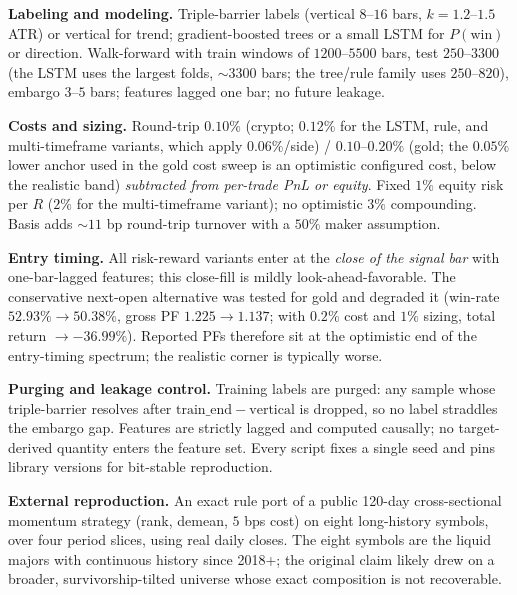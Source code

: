 \documentclass[sigconf,anonymous]{acmart}
\begin{document}
\textbf{Labeling and modeling.} Triple-barrier labels (vertical $8$–$16$ bars, $k{=}1.2$–$1.5$ ATR) or vertical for trend; gradient-boosted trees or a small LSTM for $P(\text{win})$ or direction. Walk-forward with train windows of $1200$–$5500$ bars, test $250$–$3300$ (the LSTM uses the largest folds, $\sim3300$ bars; the tree/rule family uses $250$–$820$), embargo $3$–$5$ bars; features lagged one bar; no future leakage.

\textbf{Costs and sizing.} Round-trip $0.10\%$ (crypto; $0.12\%$ for the LSTM, rule, and multi-timeframe variants, which apply $0.06\%$/side) / $0.10$–$0.20\%$ (gold; the $0.05\%$ lower anchor used in the gold cost sweep is an optimistic configured cost, below the realistic band) \emph{subtracted from per-trade PnL or equity}. Fixed $1\%$ equity risk per $R$ ($2\%$ for the multi-timeframe variant); no optimistic $3\%$ compounding. Basis adds ${\sim}11$ bp round-trip turnover with a $50\%$ maker assumption.

\textbf{Entry timing.} All risk-reward variants enter at the \emph{close of the signal bar} with one-bar-lagged features; this close-fill is mildly look-ahead-favorable. The conservative next-open alternative was tested for gold and degraded it (win-rate $52.93\%{\to}50.38\%$, gross PF $1.225{\to}1.137$; with $0.2\%$ cost and $1\%$ sizing, total return ${\to}-36.99\%$). Reported PFs therefore sit at the optimistic end of the entry-timing spectrum; the realistic corner is typically worse.

\textbf{Purging and leakage control.} Training labels are purged: any sample whose triple-barrier resolves after $\mathrm{train\_end}-\mathrm{vertical}$ is dropped, so no label straddles the embargo gap. Features are strictly lagged and computed causally; no target-derived quantity enters the feature set. Every script fixes a single seed and pins library versions for bit-stable reproduction.

\textbf{External reproduction.} An exact rule port of a public 120-day cross-sectional momentum strategy (rank, demean, $5$ bps cost) on eight long-history symbols, over four period slices, using real daily closes. The eight symbols are the liquid majors with continuous history since 2018+; the original claim likely drew on a broader, survivorship-tilted universe whose exact composition is not recoverable.
\end{document}
